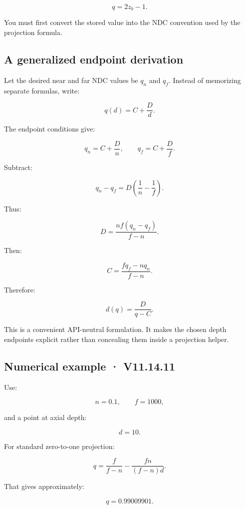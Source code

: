 \[ q=2z_b-1. \]

You must first convert the stored value into the NDC convention used by the projection formula.

\subsection{A generalized endpoint derivation}\label{02-foundations-ii-ch035-a-generalized-endpoint-derivation}

\hypertarget{02-foundations-ii-ch035-a-generalized-endpoint-derivation}{}

Let the desired near and far NDC values be \(q_n\) and \(q_f\). Instead of memorizing separate formulas, write:

\[ q(d)=C+\frac Dd. \]

The endpoint conditions give:

\[ q_n=C+\frac Dn, \qquad q_f=C+\frac Df. \]

Subtract:

\[ q_n-q_f=D\left(\frac1n-\frac1f\right). \]

Thus:

\[ \boxed{ D=\frac{nf(q_n-q_f)}{f-n}. } \]

Then:

\[ \boxed{ C=\frac{fq_f-nq_n}{f-n}. } \]

Therefore:

\[ \boxed{ d(q)=\frac D{q-C}. } \]

This is a convenient API-neutral formulation. It makes the chosen depth endpoints explicit rather than concealing them inside a projection helper.

\subsection{Numerical example · V11.14.11}\label{02-foundations-ii-ch035-numerical-example-v11.14.11}

\hypertarget{02-foundations-ii-ch035-numerical-example-v11.14.11}{}

Use:

\[ n=0.1,\qquad f=1000, \]

and a point at axial depth:

\[ d=10. \]

For standard zero-to-one projection:

\[ q=\frac f{f-n}-\frac{fn}{(f-n)d}. \]

That gives approximately:

\[ \boxed{q=0.99009901}. \]

